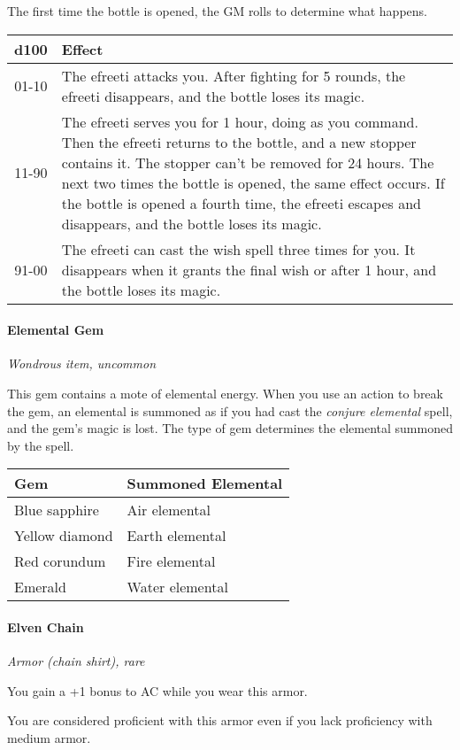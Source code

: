 \documentclass[
]{article}
\begin{document}
The first time the bottle is opened, the GM rolls to determine what
happens.

\begin{longtable}[]{@{}cl@{}}
\toprule
d100 & Effect\tabularnewline
\midrule
\endhead
01-10 & The efreeti attacks you. After fighting for 5 rounds, the
efreeti disappears, and the bottle loses its magic.\tabularnewline
11-90 & The efreeti serves you for 1 hour, doing as you command. Then
the efreeti returns to the bottle, and a new stopper contains it. The
stopper can't be removed for 24 hours. The next two times the bottle is
opened, the same effect occurs. If the bottle is opened a fourth time,
the efreeti escapes and disappears, and the bottle loses its
magic.\tabularnewline
91-00 & The efreeti can cast the wish spell three times for you. It
disappears when it grants the final wish or after 1 hour, and the bottle
loses its magic.\tabularnewline
\bottomrule
\end{longtable}

\hypertarget{elemental-gem}{%
\paragraph{Elemental Gem}\label{elemental-gem}}

\emph{Wondrous item, uncommon}

This gem contains a mote of elemental energy. When you use an action to
break the gem, an elemental is summoned as if you had cast the
\emph{conjure elemental} spell, and the gem's magic is lost. The type of
gem determines the elemental summoned by the spell.

\begin{longtable}[]{@{}ll@{}}
\toprule
Gem & Summoned Elemental\tabularnewline
\midrule
\endhead
Blue sapphire & Air elemental\tabularnewline
Yellow diamond & Earth elemental\tabularnewline
Red corundum & Fire elemental\tabularnewline
Emerald & Water elemental\tabularnewline
\bottomrule
\end{longtable}

\hypertarget{elven-chain}{%
\paragraph{Elven Chain}\label{elven-chain}}

\emph{Armor (chain shirt), rare}

You gain a +1 bonus to AC while you wear this armor.

You are considered proficient with this armor even if you lack
proficiency with medium armor.
\end{document}
